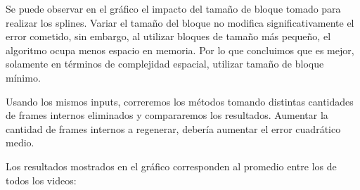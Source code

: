 \begin{figure}[ht]
	\begin{center}
	\end{center}
\end{figure}

\par Se puede observar en el gráfico el impacto del tamaño de bloque tomado para realizar los splines. Variar el tamaño del bloque no modifica significativamente el error cometido, sin embargo, al utilizar bloques de tamaño más pequeño, el algoritmo ocupa menos espacio en memoria. Por lo que concluimos que es mejor, solamente en términos de complejidad espacial, utilizar tamaño de bloque mínimo.

%
%
%


\par Usando los mismos inputs, correremos los métodos tomando distintas cantidades de frames internos eliminados y compararemos los resultados. Aumentar la cantidad de frames internos a regenerar, debería aumentar el error cuadrático medio.
\par Los resultados mostrados en el gráfico corresponden al promedio entre los de todos los videos:

